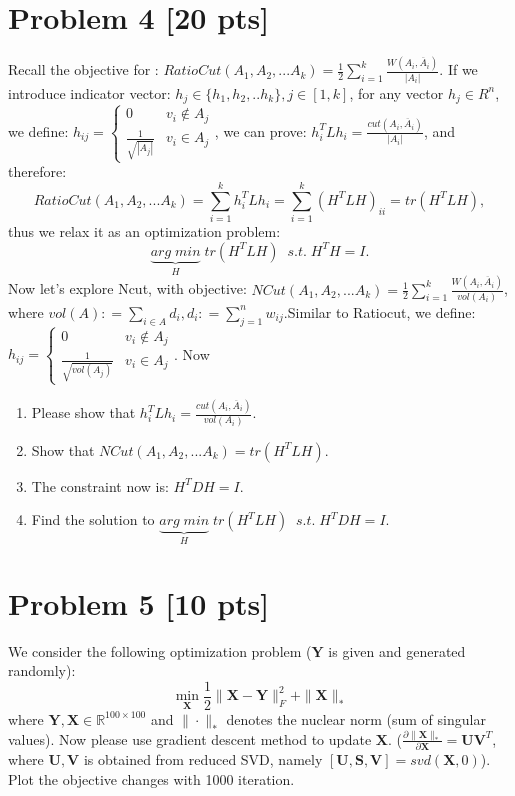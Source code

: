 \documentclass[11pt]{article}
\newcommand{\R}{\mathbb{R}}
\newcommand{\mtx}[1]{\mathbf{#1}}
\def \mU {\mtx{U}}
\def \mS {\mtx{S}}
\def \mV {\mtx{V}}
\def \mX {\mtx{X}}
\def \mY {\mtx{Y}}
\def \R {\mathbb{R}}
\begin{document}
\newpage
\section*{Problem 4 [20 pts]}
Recall the objective for : $RatioCut(A_1,A_2,...A_k) = \frac{1}{2}\sum\limits_{i=1}^{k}\frac{W(A_i, \overline{A}_i )}{|A_i|}$. If we introduce indicator vector: $h_j \in \{h_1, h_2,..h_k\}, j \in [1,k]$, for any vector $h_j\in R^n$, we define: $h_{ij}= \begin{cases} 0& { v_i \notin A_j}\\ \frac{1}{\sqrt{|A_j|}}& { v_i \in A_j} \end{cases}$, we can prove: $h_i^TLh_i =  \frac{cut(A_i, \overline{A}_i)}{|A_i|}$, and therefore:
\begin{equation}
	RatioCut(A_1,A_2,...A_k) = \sum\limits_{i=1}^{k}h_i^TLh_i = \sum\limits_{i=1}^{k}(H^TLH)_{ii} = tr(H^TLH),
\end{equation}
thus we relax it as an optimization problem:
\begin{equation}
	\underbrace{arg\;min}_H\; tr(H^TLH) \;\; s.t.\;H^TH=I.
\end{equation}
Now let's explore Ncut, with objective:
$NCut(A_1,A_2,...A_k) = \frac{1}{2}\sum\limits_{i=1}^{k}\frac{W(A_i, \overline{A}_i )}{vol(A_i)}$, where $vol(A): = \sum\limits_{i \in A}d_i, d_i: = \sum\limits_{j=1}^{n}w_{ij}$.Similar to Ratiocut, we define: $h_{ij}= \begin{cases} 0& { v_i \notin A_j}\\ \frac{1}{\sqrt{vol(A_j)}}& { v_i \in A_j} \end{cases}$. Now
\begin{enumerate}
	\item Please show that $h_i^TLh_i =\frac{cut(A_i, \overline{A}_i)}{vol(A_i)}$.
	\item Show that $NCut(A_1,A_2,...A_k) = tr(H^TLH)$.
	\item The constraint now is: $H^TDH=I$.
	\item Find the solution to $\underbrace{arg\;min}_H\; tr(H^TLH) \;\; s.t.\;H^TDH=I$.
\end{enumerate}

\newpage
\section*{Problem 5 [10 pts]}
We consider the following optimization problem ($\mY$ is given and generated randomly):
\begin{equation}
	\min_{\mX} \frac{1}{2}\|\mX-\mY\|^2_F + \|\mX\|_*
\end{equation}
where $\mY,\mX\in\R^{100\times100}$ and $\|\cdot\|_*$ denotes the nuclear norm (sum of singular values). Now please use gradient descent method to update $\mX$. ($\frac{\partial \|\mX\|_*}{\partial \mX}=\mU\mV^T$, where $\mU,\mV$ is obtained from reduced SVD, namely $[\mU,\mS,\mV]=svd(\mX,0)$). Plot the objective changes with 1000 iteration.
\end{document}
